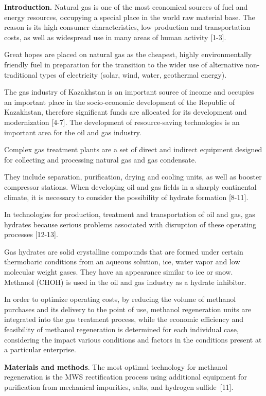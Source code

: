 \begin{multicols}{2}
{\bfseries Introduction.} Natural gas is one of the most economical sources
of fuel and energy resources, occupying a special place in the world raw
material base. The reason is its high consumer characteristics, low
production and transportation costs, as well as widespread use in many
areas of human activity {[}1-3{]}.

Great hopes are placed on natural gas as the cheapest, highly
environmentally friendly fuel in preparation for the transition to the
wider use of alternative non-traditional types of electricity (solar,
wind, water, geothermal energy).

The gas industry of Kazakhstan is an important source of income and
occupies an important place in the socio-economic development of the
Republic of Kazakhstan, therefore significant funds are allocated for
its development and modernization {[}4-7{]}. The development of
resource-saving technologies is an important area for the oil and gas
industry.

Complex gas treatment plants are a set of direct and indirect equipment
designed for collecting and processing natural gas and gas condensate.

They include separation, purification, drying and cooling units, as well
as booster compressor stations. When developing oil and gas fields in a
sharply continental climate, it is necessary to consider the possibility
of hydrate formation {[}8-11{]}.

In technologies for production, treatment and transportation of oil and
gas, gas hydrates because serious problems associated with disruption of
these operating processes {[}12-13{]}.

Gas hydrates are solid crystalline compounds that are formed under
certain thermobaric conditions from an aqueous solution, ice, water
vapor and low molecular weight gases. They have an appearance similar to
ice or snow. Methanol (CHOH) is used in the oil and gas
industry as a hydrate inhibitor.

In order to optimize operating costs, by reducing the volume of methanol
purchases and its delivery to the point of use, methanol regeneration
units are integrated into the gas treatment process, while the economic
efficiency and feasibility of methanol regeneration is determined for
each individual case, considering the impact various conditions and
factors in the conditions present at a particular enterprise.

{\bfseries Materials and methods}. The most optimal technology for methanol
regeneration is the MWS rectification process using additional equipment
for purification from mechanical impurities, salts, and hydrogen
sulfide~{[}11{]}.


\end{multicols}
